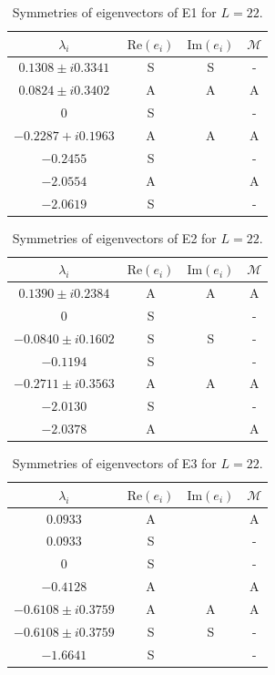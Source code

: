 \begin{table}[h!]
\caption{\label{tab:E1_sym} Symmetries of eigenvectors of E1 for $L=22$.}
{\small
\begin{tabular}{cccc} \hline
          $\lambda_i$       & $\mathrm{Re}(e_i)$    & $\mathrm{Im}(e_i)$    & $\mathcal{M}$ \\\hline
    $0.1308 \pm i0.3341$    & S     & S     & - \\
    $0.0824 \pm i0.3402$    & A     & A     & A \\
    $0$                     & S     &       & - \\
    $-0.2287+i0.1963$       & A     & A     & A \\
    $-0.2455$               & S     &       & - \\
    $-2.0554$               & A     &       & A \\
    $-2.0619$               & S     &       & - \\\hline
\end{tabular}}
\end{table}

\begin{table}[h!]
\caption{\label{tab:E2_sym} Symmetries of eigenvectors of E2 for $L=22$.}
{\small
\begin{tabular}{cccc} \hline
          $\lambda_i$       & $\mathrm{Re}(e_i)$    & $\mathrm{Im}(e_i)$    & $\mathcal{M}$ \\\hline
      $0.1390\pm i0.2384$   & A     & A     & A \\
      $0$                   & S     &       & - \\
      $-0.0840\pm i0.1602$  & S     & S     & - \\
      $-0.1194$             & S     &       & - \\
      $-0.2711\pm i0.3563$  & A     & A     & A \\
      $-2.0130$             & S     &       & - \\
      $-2.0378$             & A     &       & A \\\hline
\end{tabular}}
\end{table}

\begin{table}[h!]
\caption{\label{tab:E3_sym} Symmetries of eigenvectors of E3 for $L=22$.}
{\small
\begin{tabular}{cccc} \hline
          $\lambda_i$    & $\mathrm{Re}(e_i)$    & $\mathrm{Im}(e_i)$    & $\mathcal{M}$ \\\hline
    $0.0933$             &  A    &       & A \\
    $0.0933$             &  S    &       & - \\
    $0$                  &  S    &       & - \\
    $-0.4128$            &  A    &       & A \\
    $-0.6108\pm i0.3759$ &  A    &   A   & A \\
    $-0.6108\pm i0.3759$ &  S    &   S   & - \\
    $-1.6641$            &  S    &       & - \\\hline
\end{tabular}}
\end{table}


